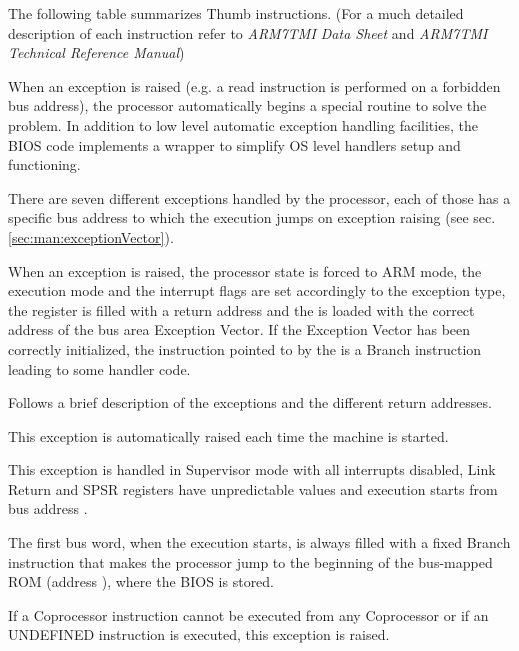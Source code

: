 The following table summarizes Thumb instructions. (For a much detailed description of each instruction refer to \emph{ARM7TMI Data Sheet} and \emph{ARM7TMI Technical Reference Manual})


\label{sec:man:exceptionHandling}

When an exception is raised (e.g. a read instruction is performed on a forbidden bus address), the processor automatically begins a special routine to solve the problem. 
In addition to low level automatic exception handling facilities, the BIOS code implements a wrapper to simplify OS level handlers setup and functioning.

\label{sec:man:hardwareExceptions}

There are seven different exceptions handled by the processor, each of those has a specific bus address to which the execution jumps on exception raising (see sec. \ref{sec:man:exceptionVector}).

When an exception is raised, the processor state is forced to ARM mode, the execution mode and the interrupt flags are set accordingly to the exception type, the  register is filled with a return address and the  is loaded with the correct address of the bus area Exception Vector. 
If the Exception Vector has been correctly initialized, the instruction pointed to by the  is a Branch instruction leading to some handler code.

Follows a brief description of the exceptions and the different return addresses.

This exception is automatically raised each time the machine is started. 

This exception is handled in Supervisor mode with all interrupts disabled, Link Return and SPSR registers have unpredictable values and execution starts from bus address .

The first bus word, when the execution starts, is always filled with a fixed Branch instruction that makes the processor jump to the beginning of the bus-mapped ROM (address ), where the BIOS is stored.

If a Coprocessor instruction cannot be executed from any Coprocessor or if an UNDEFINED instruction is executed, this exception is raised. 

